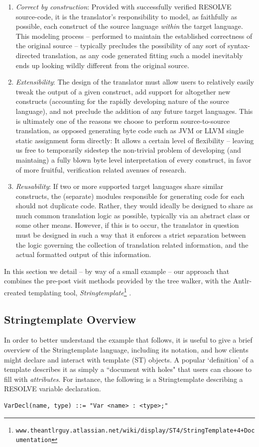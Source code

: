 \documentclass[times]{speauth}
\begin{document}
\begin{enumerate}
\item \textit{Correct by construction}: Provided with successfully verified RESOLVE source-code, it is the translator's responsibility to model, as faithfully as possible, each construct of the source language \textit{within} the target language. This modeling process -- performed to maintain the established correctness of the original source -- typically precludes the possibility of any sort of syntax-directed translation, as any code generated fitting such a model inevitably ends up looking wildly different from the original source.
\item \textit{Extensibility}: The design of the translator must allow users to relatively easily tweak the output of a given construct, add support for altogether new constructs (accounting for the rapidly developing nature of the source language), and not preclude the addition of any future target languages. This is ultimately one of the reasons we choose to perform source-to-source translation, as opposed generating byte code such as JVM or LLVM single static assignment form directly: It allows a certain level of flexibility -- leaving us free to temporarily sidestep the non-trivial problem of developing (and maintaing) a fully blown byte level interpretation of every construct, in favor of more fruitful, verification related avenues of research.
\item \textit{Reusability}: If two or more supported target languages share similar constructs, the (separate) modules responsible for generating code for each should not duplicate code. Rather, they would ideally be designed to share as much common translation logic as possible, typically via an abstract class or some other means. However, if this is to occur, the translator in question must be designed in such a way that it enforces a strict separation between the logic governing the collection of translation related information, and the actual formatted output of this information.
\end{enumerate}

In this section we detail -- by way of a small example -- our approach that combines the pre-post visit methods provided by the tree walker, with the Antlr-created templating tool, \textit{Stringtemplate}\footnote[3]{\texttt{www.theantlrguy.atlassian.net/wiki/display/ST4/StringTemplate+4+Documentation}} \cite{parr:2006}.

\subsection{Stringtemplate Overview}
In order to better understand the example that follows, it is useful to give a brief overview of the Stringtemplate language, including its notation, and how clients might declare and interact with template (ST) objects. A popular `definition' of a template describes it as simply a ``document with holes" that users can choose to fill with \textit{attributes}. For instance, the following is a Stringtemplate describing a RESOLVE variable declaration.
\begin{lstlisting}
VarDecl(name, type) ::= "Var <name> : <type>;"
\end{lstlisting}
\end{document}

